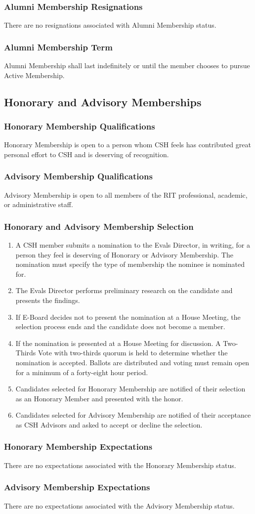 \documentclass{article}
\newcommand{\asection}[1]{\subsection{#1} \label{#1}}
\newcommand{\asubsection}[1]{\subsubsection{#1} \label{#1}}
\begin{document}
\asubsection{Alumni Membership Resignations}
There are no resignations associated with Alumni Membership status.

\asubsection{Alumni Membership Term}
Alumni Membership shall last indefinitely or until the member chooses to pursue Active Membership.

\asection{Honorary and Advisory Memberships}

\asubsection{Honorary Membership Qualifications}
Honorary Membership is open to a person whom CSH feels has contributed great personal effort to CSH and is deserving of recognition.

\asubsection{Advisory Membership Qualifications}
Advisory Membership is open to all members of the RIT professional, academic, or administrative staff.

\asubsection{Honorary and Advisory Membership Selection}
\begin{enumerate}
	\item A CSH member submits a nomination to the Evals Director, in writing, for a person they feel is deserving of Honorary or Advisory Membership. The nomination must specify the type of membership the nominee is nominated for.
	\item The Evals Director performs preliminary research on the candidate and presents the findings.
	\item If E-Board decides not to present the nomination at a House Meeting, the selection process ends and the candidate does not become a member.
	\item If the nomination is presented at a House Meeting for discussion. A Two-Thirds Vote with two-thirds quorum is held to determine whether the nomination is accepted.
	      Ballots are distributed and voting must remain open for a minimum of a forty-eight hour period.
	\item Candidates selected for Honorary Membership are notified of their selection as an Honorary Member and presented with the honor.
	\item Candidates selected for Advisory Membership are notified of their acceptance as CSH Advisors and asked to accept or decline the selection.
\end{enumerate}

\asubsection{Honorary Membership Expectations}
There are no expectations associated with the Honorary Membership status.

\asubsection{Advisory Membership Expectations}
There are no expectations associated with the Advisory Membership status.
\end{document}
